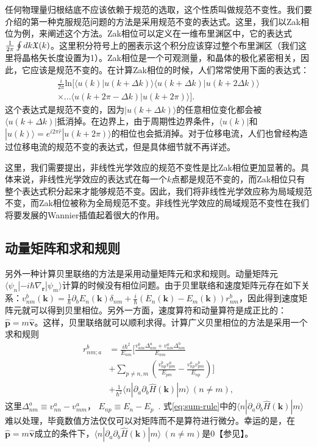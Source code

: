 任何物理量归根结底不应该依赖于规范的选取，这个性质叫做规范不变性。我们要介绍的第一种克服规范问题的方法是采用规范不变的表达式。这里，我们以Zak相位\cite{zak_berrys_1989}为例，来阐述这个方法。Zak相位可以定义在一维布里渊区中，它的表达式$\frac{1}{2\pi}\ointop dk\berry(k)$。这里积分符号上的圈表示这个积分应该穿过整个布里渊区（我们这里将晶格矢长度设置为1）。Zak相位是一个可观测量，和晶体的极化紧密相关\cite{king-smith_theory_1993,resta_theory_1992}，因此，它应该是规范不变的。在计算Zak相位的时候，人们常常使用下面的表达式：
\begin{align*}
\frac{i}{2\pi}\text{ln}[\langle u(k)|u(k+\Delta k)\rangle\langle u(k+\Delta k)|u(k+2\Delta k)\rangle\\
\times...\langle u(k+2\pi-\Delta k)|u(k+2\pi)\rangle].
\end{align*}
这个表达式是规范不变的，因为$|u(k+\Delta k)\rangle$的任意相位变化都会被$\langle u(k+\Delta k)|$抵消掉。在边界上，由于周期性边界条件，$\langle u(k)|$和$|u(k)\rangle=e^{i2\pi\hat{r}}|u(k+2\pi)\rangle$的相位也会抵消掉。对于位移电流，人们也曾经构造过位移电流的规范不变的表达式\cite{young2012}，但是具体细节就不再详述。


这里，我们需要提出，非线性光学效应的规范不变性是比Zak相位更加显著的。具体来说，非线性光学效应的表达式在每一个$k$点都是规范不变的，而Zak相位只有整个表达式积分起来才能够规范不变。因此，我们将非线性光学效应称为局域规范不变，而Zak相位被称为全局规范不变。非线性光学效应的局域规范不变性在我们将要发展的Wannier插值起着很大的作用。

\subsection{动量矩阵和求和规则}

另外一种计算贝里联络的方法是采用动量矩阵元和求和规则\cite{sipe_second-order_2000}。动量矩阵元$\langle\psi_{n}|-i\hbar\nabla_{\mathbf{r}}|\psi_{m}\rangle$计算的时候没有相位问题。由于贝里联络和速度矩阵元存在如下关系：$v_{nm}^{b}(\mathbf{k})=\frac{1}{\hbar}\partial_{b}E_{n}(\mathbf{k})\delta_{nm}+\frac{i}{\hbar}(E_{n}(\mathbf{k})-E_{m}(\mathbf{k}))r_{nm}^{b}$，因此得到速度矩阵元就可以得到贝里相位。另外一方面，速度算符和动量算符是成正比的：$\hat{\mathbf{p}}=m\hat{\mathbf{v}}$。这样，贝里联络就可以顺利求得。计算广义贝里相位的方法是采用一个求和规则
\begin{align}
r_{nm;a}^{b} & =\frac{i\hbar^{2}}{E_{nm}}[\frac{v_{nm}^{b}\Delta_{nm}^{a}+v_{nm}^{a}\Delta_{nm}^{b}}{E_{nm}}\nonumber \\
& +\sum_{p\ne n,m}(\frac{v_{np}^{b}v_{pm}^{a}}{E_{pm}}-\frac{v_{np}^{a}v_{pm}^{b}}{E_{np}})]\label{eq:sum-rule}\\ 
& +\frac{1}{\hbar^{2}}\langle n|\partial_{a}\partial_{b}\hat{H}(\mathbf{k})|m\rangle~(n\ne m)\nonumber,
\end{align}
这里$\Delta_{nm}^{a}\equiv v_{nn}^{a}-v_{mm}^{a}$， $E_{np}\equiv E_{n}-E_{p}$~\cite{cook_design_2017}.
式\ref{eq:sum-rule}中的$\langle n|\partial_{a}\partial_{b}\hat{H}(\mathbf{k})|m\rangle$难以处理，毕竟数值方法仅仅可以对矩阵而不是算符进行微分。幸运的是，在$\hat{\mathbf{p}}=m\hat{\mathbf{v}}$成立的条件下，$\langle n|\partial_{a}\partial_{b}\hat{H}(\mathbf{k})|m\rangle \  (n\ne m)$是0【参见】。

